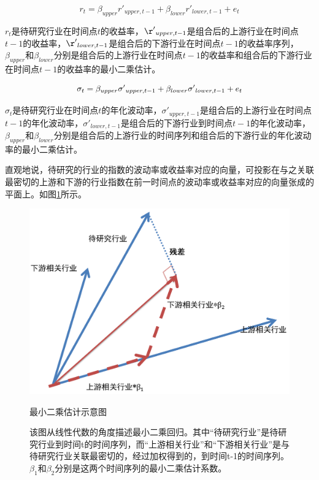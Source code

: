 \documentclass{sysuthesis}
\begin{document}
\begin{equation}
\label{least-square-yield}
{{r}_t} = {\beta _{upper}}{{r'}_{upper,t - 1}} + {\beta _{lower}} {{r'}_{lower,t - 1}} + {{e}_t}
\end{equation}

${{r}_t}$是待研究行业在时间点$t$的收益率，${{\r '}_{upper,t - 1}}$是组合后的上游行业在时间点$t-1$的收益率，${{\r '}_{lower,t - 1}}$是组合后的下游行业在时间点$t-1$的收益率序列，${\beta _{upper}}$和${\beta _{lower}}$分别是组合后的上游行业在时间点$t-1$的收益率和组合后的下游行业在时间点$t-1$的收益率的最小二乘估计。

\begin{equation}
\label{least-square-volatility}
{{\sigma }_t} = {\beta _{upper}}{{\bf{\sigma '}}_{upper,t - 1}} + {\beta _{lower}} {{\sigma '}_{lower,t - 1}} + {{e}_t}
\end{equation}

${{\sigma }_t}$是待研究行业在时间点$t$的年化波动率，${{\sigma '}_{upper,t - 1}}$是组合后的上游行业在时间点$t-1$的年化波动率，${{\sigma '}_{lower,t - 1}}$是组合后的下游行业到时间点$t-1$的年化波动率，${\beta _{upper}}$和${\beta _{lower}}$分别是组合后的上游行业的时间序列和组合后的下游行业的年化波动率的最小二乘估计。

直观地说，待研究的行业的指数的波动率或收益率对应的向量，可投影在与之关联最密切的上游和下游的行业指数在前一时间点的波动率或收益率对应的向量张成的平面上。如图\ref{fig:least-square-estimation}所示。

\begin{figure}[htbp]
\centering
\includegraphics[scale=0.8]{image/最小二乘回归_1_1.png}
\caption{最小二乘估计示意图}
\caption*{\footnotesize 该图从线性代数的角度描述最小二乘回归。其中“待研究行业”是待研究行业到时间t的时间序列，而“上游相关行业”和“下游相关行业”是与待研究行业关联最密切的，经过加权得到的，到时间t-1的时间序列。$\beta_{1}$和$\beta_{2}$分别是这两个时间序列的最小二乘估计系数。}
\label{fig:least-square-estimation}
\end{figure}
\end{document}

